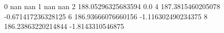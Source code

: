 0 nan nan
1 nan nan
2 188.05296325683594 0.0
4 187.3815460205078 -0.671417236328125
6 186.93666076660156 -1.116302490234375
8 186.23863220214844 -1.8143310546875
